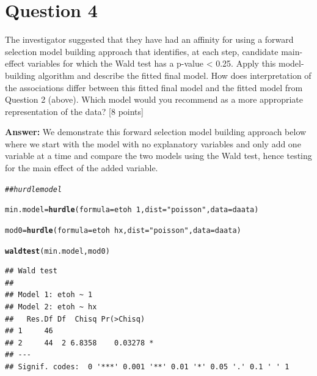 \documentclass{article}\usepackage[]{graphicx}\usepackage[]{color}
\makeatletter
\newcommand{\hlnum}[1]{\textcolor[rgb]{0.686,0.059,0.569}{#1}}%
\newcommand{\hlstr}[1]{\textcolor[rgb]{0.192,0.494,0.8}{#1}}%
\newcommand{\hlcom}[1]{\textcolor[rgb]{0.678,0.584,0.686}{\textit{#1}}}%
\newcommand{\hlopt}[1]{\textcolor[rgb]{0,0,0}{#1}}%
\newcommand{\hlstd}[1]{\textcolor[rgb]{0.345,0.345,0.345}{#1}}%
\newcommand{\hlkwb}[1]{\textcolor[rgb]{0.69,0.353,0.396}{#1}}%
\newcommand{\hlkwc}[1]{\textcolor[rgb]{0.333,0.667,0.333}{#1}}%
\newcommand{\hlkwd}[1]{\textcolor[rgb]{0.737,0.353,0.396}{\textbf{#1}}}%
\newenvironment{kframe}{%
 \def\at@end@of@kframe{}%
 \ifinner\ifhmode%
  \def\at@end@of@kframe{\end{minipage}}%
  \begin{minipage}{\columnwidth}%
 \fi\fi%
 \def\FrameCommand##1{\hskip\@totalleftmargin \hskip-\fboxsep
 \colorbox{shadecolor}{##1}\hskip-\fboxsep
     \hskip-\linewidth \hskip-\@totalleftmargin \hskip\columnwidth}%
 \MakeFramed {\advance\hsize-\width
   \@totalleftmargin\z@ \linewidth\hsize
   \@setminipage}}%
 {\par\unskip\endMakeFramed%
 \at@end@of@kframe}
\newenvironment{knitrout}{}{} %
\makeatother
\begin{document}

\section*{ Question 4} 

The investigator suggested that they have had an affinity for using a forward
selection model building approach that identifies, at each step, candidate
main-effect variables for which the Wald test has a p-value < 0.25. Apply
this model-building algorithm and describe the fitted final model. How does
interpretation of the associations differ between this fitted final model and the fitted model from Question 2 (above). Which model would you recommend as
a more appropriate representation of the data? [8 points]

\vspace{5mm}

{\bf Answer:} We demonstrate this forward selection model building approach below where we start with the model with no explanatory variables and only add one variable at a time and compare the two models using the Wald test, hence testing for the main effect of the added variable. 
 
 
 
\begin{knitrout}
\color{fgcolor}\begin{kframe}
\begin{alltt}
\hlcom{## hurdle model}

\hlstd{min.model} \hlkwb{=} \hlkwd{hurdle}\hlstd{(}\hlkwc{formula} \hlstd{= etoh} \hlopt{~} \hlnum{1}\hlstd{,} \hlkwc{dist} \hlstd{=} \hlstr{"poisson"}\hlstd{,} \hlkwc{data} \hlstd{= daata)}

\hlstd{mod0} \hlkwb{=} \hlkwd{hurdle}\hlstd{(}\hlkwc{formula} \hlstd{= etoh} \hlopt{~} \hlstd{hx,} \hlkwc{dist} \hlstd{=} \hlstr{"poisson"}\hlstd{,} \hlkwc{data} \hlstd{= daata)}

\hlkwd{waldtest}\hlstd{(min.model, mod0)}
\end{alltt}
\begin{verbatim}
## Wald test
## 
## Model 1: etoh ~ 1
## Model 2: etoh ~ hx
##   Res.Df Df  Chisq Pr(>Chisq)  
## 1     46                       
## 2     44  2 6.8358    0.03278 *
## ---
## Signif. codes:  0 '***' 0.001 '**' 0.01 '*' 0.05 '.' 0.1 ' ' 1
\end{verbatim}
\end{kframe}
\end{knitrout}
\end{document}
